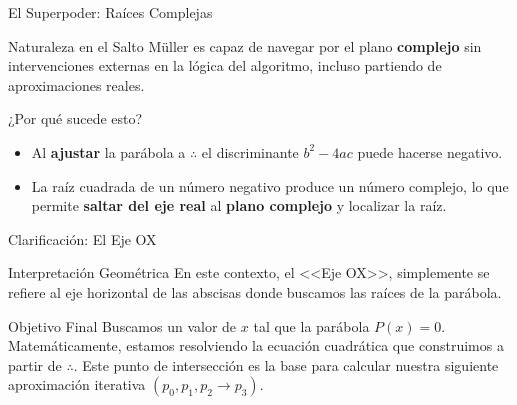 \documentclass[aspectratio=169, t]{beamer}
\begin{document}
\begin{frame}{El Superpoder: Raíces Complejas}
    \begin{concept}{Naturaleza en el Salto}
        Müller es capaz de navegar por el plano \textbf{complejo} sin intervenciones externas en la lógica del algoritmo, incluso partiendo de aproximaciones reales.
    \end{concept}

    \vspace{0.2cm}
    \begin{mathstep}{¿Por qué sucede esto?}
        \begin{itemize}
            \item Al \textbf{ajustar} la parábola a $\therefore$ el discriminante \(b^2 - 4ac\) puede hacerse negativo.
            \item La raíz cuadrada de un número negativo produce un número complejo, lo que permite \textbf{saltar del eje real} al \textbf{plano complejo} y localizar la raíz.
        \end{itemize}
    \end{mathstep}
\end{frame}

\begin{frame}{Clarificación: El Eje OX}
    \begin{concept}{Interpretación Geométrica}
        En este contexto, el <<Eje OX>>, simplemente se refiere al eje horizontal de las abscisas donde buscamos las raíces de la parábola.
    \end{concept}

    \vspace{0.2cm}
    \begin{mathstep}{Objetivo Final}
        Buscamos un valor de $x$ tal que la parábola $P(x) = 0$. Matemáticamente, estamos resolviendo la ecuación cuadrática que construimos a partir de $\therefore$. Este punto de intersección es la base para calcular nuestra siguiente aproximación iterativa $(p_0,p_1,p_2 \to p_3)$.
    \end{mathstep}
\end{frame}
\end{document}
